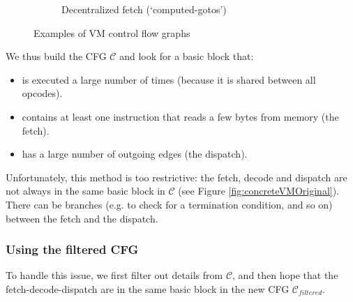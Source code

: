 \documentclass[english]{article}
\begin{document}
\begin{figure}[htp]
\begin{subfigure}{.5\textwidth}
		\caption{Decentralized fetch (`computed-gotos')}
		\label{fig:abstractVM:Decentralized}
	\end{subfigure}
	\caption{Examples of VM control flow graphs}
	\label{fig:abstractVM}
\end{figure}

We thus build the CFG $\mathcal{C}$ and look for a basic block that:
\begin{itemize}
	\item is executed a large number of times (because it is shared between all opcodes).
	\item contains at least one instruction that reads a few bytes from memory (the fetch).
	\item has a large number of outgoing edges (the dispatch).
\end{itemize} 

Unfortunately, this method is too restrictive: the fetch, decode and dispatch are not always in the same basic block in $\mathcal{C}$ (see Figure \ref{fig:concreteVMOriginal}). There can be branches (e.g. to check for a termination condition, and so on) between the fetch and the dispatch. 

\subsubsection{Using the filtered CFG}

To handle this issue, we first filter out details from $\mathcal{C}$, and then hope that the fetch-decode-dispatch are in the same basic block in the new CFG $\mathcal{C}_{filtered}$. 
\end{document}
